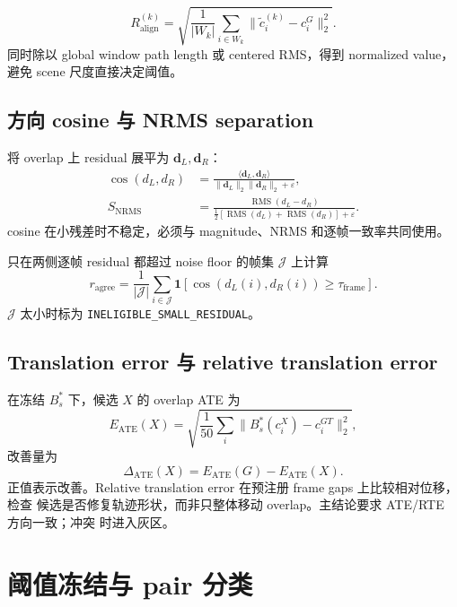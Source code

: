 \documentclass[UTF8,a4paper,11pt]{ctexart}
\newcommand{\RMS}{\operatorname{RMS}}
\begin{document}
\begin{equation}
  R_{\mathrm{align}}^{(k)}
  =\sqrt{\frac{1}{|W_k|}\sum_{i\in W_k}
  \|\widetilde c_i^{(k)}-c_i^G\|_2^2}.
\end{equation}
同时除以 global window path length 或 centered RMS，得到 normalized value，避免 scene
尺度直接决定阈值。

\subsection{方向 cosine 与 NRMS separation}

将 overlap 上 residual 展平为 $\mathbf d_L,\mathbf d_R$：
\begin{align}
  \cos(d_L,d_R)&=\frac{\langle\mathbf d_L,\mathbf d_R\rangle}
  {\|\mathbf d_L\|_2\|\mathbf d_R\|_2+\varepsilon},\\
  S_{\mathrm{NRMS}}&=
  \frac{\RMS(d_L-d_R)}
  {\tfrac12[\RMS(d_L)+\RMS(d_R)]+\varepsilon}.
\end{align}
cosine 在小残差时不稳定，必须与 magnitude、NRMS 和逐帧一致率共同使用。

只在两侧逐帧 residual 都超过 noise floor 的帧集 $\mathcal J$ 上计算
\begin{equation}
  r_{\mathrm{agree}}=\frac1{|\mathcal J|}
  \sum_{i\in\mathcal J}
  \mathbf1[\cos(d_L(i),d_R(i))\ge\tau_{\mathrm{frame}}].
\end{equation}
$\mathcal J$ 太小时标为 \texttt{INELIGIBLE\_SMALL\_RESIDUAL}。

\subsection{Translation error 与 relative translation error}

在冻结 $B_s^*$ 下，候选 $X$ 的 overlap ATE 为
\begin{equation}
  E_{\mathrm{ATE}}(X)=
  \sqrt{\frac1{50}\sum_i\|B_s^*(c_i^X)-c_i^{GT}\|_2^2},
\end{equation}
改善量为
\begin{equation}
  \Delta_{\mathrm{ATE}}(X)=E_{\mathrm{ATE}}(G)-E_{\mathrm{ATE}}(X).
\end{equation}
正值表示改善。Relative translation error 在预注册 frame gaps 上比较相对位移，检查
候选是否修复轨迹形状，而非只整体移动 overlap。主结论要求 ATE/RTE 方向一致；冲突
时进入灰区。

\section{阈值冻结与 pair 分类}
\end{document}
